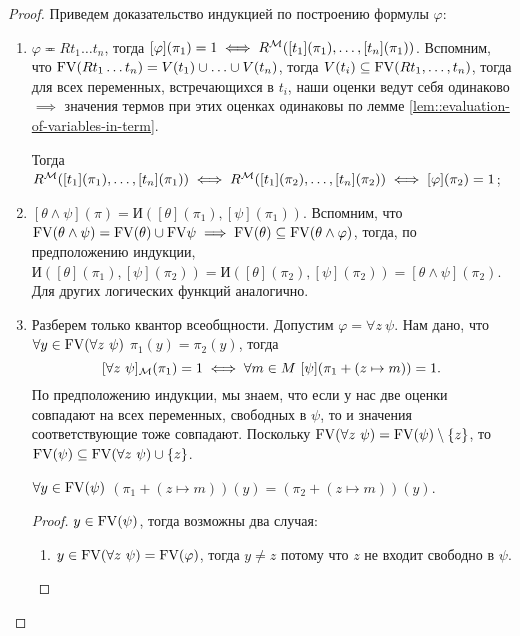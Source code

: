 \begin{proof}
    Приведем доказательство индукцией по построению формулы $\varphi$:
    \begin{enumerate}
        \item $\varphi \eqcirc R t_{1} \ldots t_{n}$, тогда $[\varphi](\pi_{1}) = 1 \iff R^{\mathcal{M}}([t_{1}](\pi_{1}), \ldots, [t_{n}](\pi_{1}))$.
        Вспомним, что $\mathrm{FV}(R t_{1} \ldots t_{n}) = V(t_{1}) \cup \ldots \cup V(t_{n})$, тогда $V(t_{i}) \subseteq \mathrm{FV}(R t_{1}, \ldots, t_{n})$, тогда для всех переменных, встречающихся в $t_{i}$, наши оценки ведут себя одинаково $\implies$ значения термов при этих оценках одинаковы по лемме \ref{lem::evaluation-of-variables-in-term}.
        
        Тогда $R^{\mathcal{M}}([t_{1}](\pi_{1}), \ldots, [t_{n}](\pi_{1})) \iff R^{\mathcal{M}}([t_{1}](\pi_{2}), \ldots, [t_{n}](\pi_{2})) \iff [\varphi](\pi_{2}) = 1$;
        \item $[\theta \land \psi](\pi) = \text{И}([\theta](\pi_{1}), [\psi](\pi_{1}))$.
        Вспомним, что $\mathrm{FV}(\theta \land \psi) = \mathrm{FV}(\theta) \cup \mathrm{FV}{\psi} \implies \mathrm{FV}(\theta) \subseteq \mathrm{FV}(\theta \land \varphi)$, тогда, по предположению индукции, $\text{И}([\theta](\pi_{1}), [\psi](\pi_{2})) = \text{И}([\theta](\pi_{2}), [\psi](\pi_{2})) = [\theta \land \psi](\pi_{2})$.
        Для других логических функций аналогично.
        \item Разберем только квантор всеобщности.
        Допустим $\varphi = \forall z~ \psi$.
        Нам дано, что $\forall y \in \mathrm{FV}(\forall z~ \psi)$ $\pi_{1}(y) = \pi_{2}(y)$, тогда
        $$
            [\forall z~ \psi]_{\mathcal{M}}(\pi_1) = 1 \iff \forall m \in M~ [\psi](\pi_{1} + (z \mapsto m)) = 1.
        $$
        По предположению индукции, мы знаем, что если у нас две оценки совпадают на всех переменных, свободных в $\psi$, то и значения соответствующие тоже совпадают.
        Поскольку $\mathrm{FV}(\forall z~\psi) = \mathrm{FV}(\psi) \setminus \{z\}$, то $\mathrm{FV}(\psi) \subseteq \mathrm{FV}(\forall z~ \psi) \cup \{z\}$.
        \begin{statement}
            $\forall y \in \mathrm{FV}(\psi)$ $(\pi_{1} + (z \mapsto m))(y) = (\pi_{2} + (z \mapsto m))(y)$.
        \end{statement}
        \begin{proof}
            $y \in \mathrm{FV}(\psi)$, тогда возможны два случая:
            \begin{enumerate}
                \item $y \in \mathrm{FV}(\forall z~\psi) = \mathrm{FV}(\varphi)$, тогда $y \neq z$ потому что $z$ не входит свободно в $\psi$.

\end{enumerate}
\end{proof}
\end{enumerate}
\end{proof}
